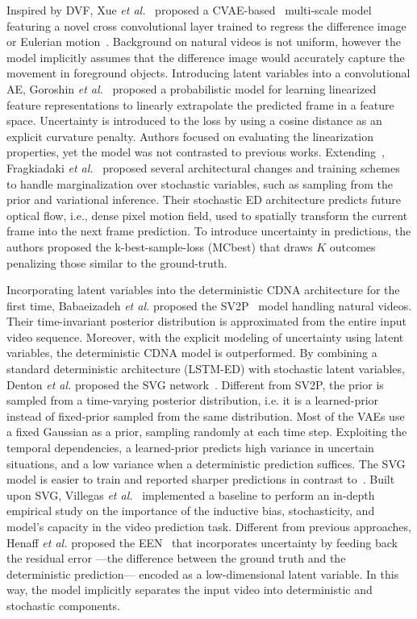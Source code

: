 Inspired by \ac{DVF}, Xue \textit{et al.}~\cite{Xue2016} proposed a \ac{CVAE}-based~\cite{Kingma2014,Yan2016} multi-scale model featuring a novel cross convolutional layer trained to regress the difference image or Eulerian motion~\cite{Wu2012}. Background on natural videos is not uniform, however the model implicitly assumes that the difference image would accurately capture the movement in foreground objects. Introducing latent variables into a convolutional \ac{AE}, Goroshin \textit{et al.}~\cite{Goroshin2015a} proposed a probabilistic model for learning linearized feature representations to linearly extrapolate the predicted frame in a feature space. Uncertainty is introduced to the loss by using a cosine distance as an explicit curvature penalty. Authors focused on evaluating the linearization properties, yet the model was not contrasted to previous works. Extending~\cite{Xue2016,Walker2016}, Fragkiadaki \textit{et al.}~\cite{Fragkiadaki2017} proposed several architectural changes and training schemes to handle marginalization over stochastic variables, such as sampling from the prior and variational inference. Their stochastic \ac{ED} architecture predicts future optical flow, i.e., dense pixel motion field, used to spatially transform the current frame into the next frame prediction. To introduce uncertainty in predictions, the authors proposed the k-best-sample-loss (MCbest) that draws $K$ outcomes penalizing those similar to the ground-truth. 

Incorporating latent variables into the deterministic \ac{CDNA} architecture for the first time, Babaeizadeh \textit{et al.} proposed the \ac{SV2P}~\cite{Babaeizadeh2018} model handling natural videos. Their time-invariant posterior distribution is approximated from the entire input video sequence. Moreover, with the explicit modeling of uncertainty using latent variables, the deterministic \ac{CDNA} model is outperformed. By combining a standard deterministic architecture (\ac{LSTM}-\ac{ED}) with stochastic latent variables, Denton \textit{et al.} proposed the \ac{SVG} network~\cite{Denton2018}. Different from \ac{SV2P}, the prior is sampled from a time-varying posterior distribution, i.e. it is a learned-prior instead of fixed-prior sampled from the same distribution. Most of the \acp{VAE} use a fixed Gaussian as a prior, sampling randomly at each time step. Exploiting the temporal dependencies, a learned-prior predicts high variance in uncertain situations, and a low variance when a deterministic prediction suffices. The \ac{SVG} model is easier to train and reported sharper predictions in contrast to~\cite{Babaeizadeh2018}. Built upon \ac{SVG}, Villegas \textit{et al.}~\cite{Villegas2019} implemented a baseline to perform an in-depth empirical study on the importance of the inductive bias, stochasticity, and model's capacity in the video prediction task. Different from previous approaches, Henaff \textit{et al.} proposed the \ac{EEN}~\cite{Henaff2017} that incorporates uncertainty by feeding back the residual error ---the difference between the ground truth and the deterministic prediction--- encoded as a low-dimensional latent variable. In this way, the model implicitly separates the input video into deterministic and stochastic components.


